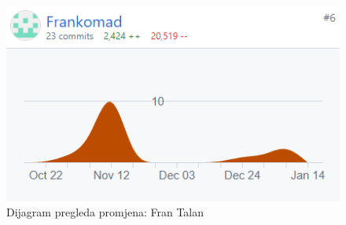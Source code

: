 		\begin{figure}
			\centering
			\includegraphics[width=0.8\linewidth]{slike/graf_talan.png}
			\caption{Dijagram pregleda promjena: Fran Talan}
			\label{fig:graf_talan}
		\end{figure}

		
		

